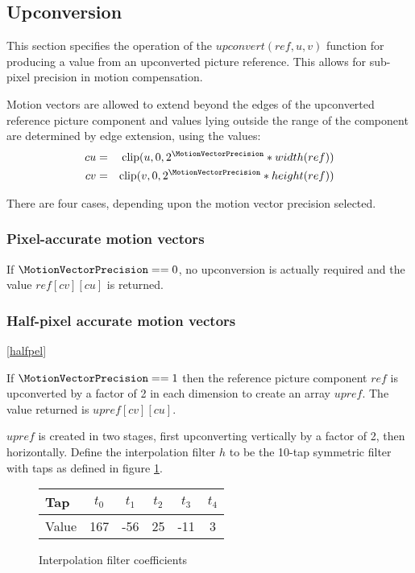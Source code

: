 \subsection{Upconversion}
\label{upconvert}

This section specifies the operation of the $upconvert(ref, u, v)$ function
for producing a value from an upconverted picture reference. This
allows for sub-pixel precision in motion compensation.

Motion vectors are allowed to extend beyond the edges of the 
upconverted reference picture component and values lying outside the range
of the component are determined by edge extension, using the values:
\begin{eqnarray*}
cu & = &\clip(u, 0, 2^\MotionVectorPrecision*width(ref)) \\
cv & = &\clip(v, 0, 2^\MotionVectorPrecision*height(ref))
\end{eqnarray*}

There are four cases, depending upon the motion vector precision selected.

\subsubsection{Pixel-accurate motion vectors}

If $\MotionVectorPrecision==0$, no upconversion is actually required and the value
$ref[cv][cu]$ is returned.

\subsubsection{Half-pixel accurate motion vectors}
\ref{halfpel}

If $\MotionVectorPrecision==1$ then the reference picture component $ref$ is
upconverted by a factor of 2 in each dimension to create an
array $upref$. The value returned is $upref[cv][cu]$.

$upref$ is created in two stages, first upconverting vertically by
a factor of 2, then horizontally. Define the interpolation filter $h$
to be the 10-tap symmetric filter with taps as defined in figure \ref{upfilter}.

\begin{figure}[h!]
\begin{centering}
\begin{tabular}{l|ccccc}
Tap & $t_0$ & $t_1$ & $t_2$ & $t_3$ & $t_4$\\
\hline
Value & 167 & -56 & 25 & -11 & 3
\end{tabular}
\caption{Interpolation filter coefficients \label{upfilter}}
\end{centering}
\end{figure}
